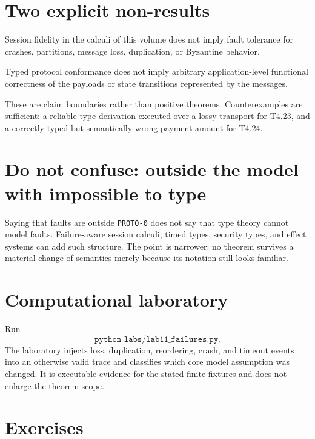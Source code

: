 \section{Two explicit non-results}
\begin{proposition}
Session fidelity in the calculi of this volume does not imply fault tolerance for crashes, partitions, message loss, duplication, or Byzantine behavior.
\end{proposition}
\begin{proposition}
Typed protocol conformance does not imply arbitrary application-level functional correctness of the payloads or state transitions represented by the messages.
\end{proposition}
These are claim boundaries rather than positive theorems. Counterexamples are sufficient: a reliable-type derivation executed over a lossy transport for T4.23, and a correctly typed but semantically wrong payment amount for T4.24.



\section{Do not confuse: outside the model with impossible to type}
\begin{warningbox}
Saying that faults are outside \texttt{PROTO-0} does not say that type theory cannot model faults. Failure-aware session calculi, timed types, security types, and effect systems can add such structure. The point is narrower: no theorem survives a material change of semantics merely because its notation still looks familiar.
\end{warningbox}



\section{Computational laboratory}
\begin{labbox}
Run
\[
  \texttt{python labs/lab11_failures.py}.
\]
The laboratory injects loss, duplication, reordering, crash, and timeout events into an otherwise valid trace and classifies which core model assumption was changed. It is executable evidence for the stated finite fixtures and does not enlarge the theorem scope.
\end{labbox}

\section{Exercises}

